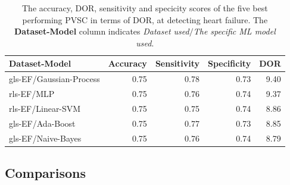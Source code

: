 \begin{table}
    \centering
    \begin{tabular}{lrrrr}
        \toprule
        Dataset-Model           &  Accuracy &  Sensitivity &  Specificity &  DOR \\
        \midrule
        gls-EF/Gaussian-Process &      0.75 &         0.78 &         0.73 & 9.40 \\
        rls-EF/MLP              &      0.75 &         0.76 &         0.74 & 9.37 \\
        rls-EF/Linear-SVM       &      0.75 &         0.75 &         0.74 & 8.86 \\
        gls-EF/Ada-Boost        &      0.75 &         0.77 &         0.73 & 8.85 \\
        gls-EF/Naive-Bayes      &      0.75 &         0.76 &         0.74 & 8.79 \\
        \bottomrule
    \end{tabular}
    \caption{The accuracy, DOR, sensitivity and specicity scores of the five best performing PVSC in terms of DOR, at detecting heart failure.
             The \textbf{Dataset-Model} column indicates \textit{Dataset used}$/$\textit{The specific ML model used}.}
    \label{tab:pvmlc_hf_dor_sens_spec_dis}
\end{table}

\clearpage
\subsection{Comparisons}

